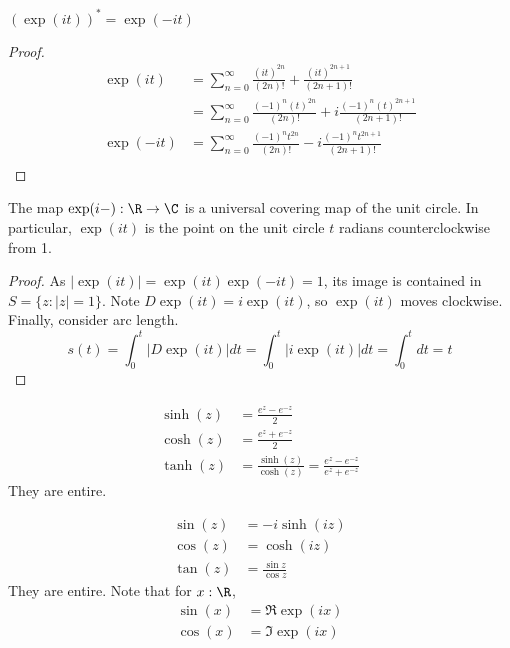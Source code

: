 \documentclass[10pt]{scrartcl}
\numberwithin{thms}{section}
\begin{document}
\begin{lemma}
$\left(\exp(it)\right)^*=\exp(-it)$ 
\end{lemma}
\begin{proof}
  \begin{align*}
    \exp(it)&=\sum_{n=0}^\infty\frac{(it)^{2n}}{(2n)!} +\frac{(it)^{2n+1}}{(2n+1)!}\\
            &=\sum_{n=0}^\infty\frac{(-1)^n(t)^{2n}}{(2n)!} +i\frac{(-1)^n(t)^{2n+1}}{(2n+1)!}\\
    \exp(-it) &=\sum_{n=0}^\infty\frac{(-1)^nt^{2n}}{(2n)!} -i\frac{(-1)^nt^{2n+1}}{(2n+1)!}\\
\end{align*}
\end{proof}

\begin{theorem}
  The map $\exp(i-):\R\to\C$ is a universal covering map of the unit circle. In particular, $\exp(it)$ is the point on the unit circle $t$ radians counterclockwise from 1. 
\end{theorem}
\begin{proof}
  As $|\exp(it)|=\exp(it)\exp(-it)=1$, its image is contained in $S=\{z:|z|=1\}$.
  Note $D\exp(it)=i\exp(it)$, so $\exp(it)$ moves clockwise. 
  Finally, consider arc length.
  \[
  s(t)= \int_0^t |D\exp(it)|dt = \int_0^t |i\exp(it)|dt = \int_0^t dt = t
  \]
\end{proof}

\begin{example}
  \begin{align*}
    \sinh(z)&=\frac{e^z-e^{-z}}2\\
    \cosh(z)&=\frac{e^z+e^{-z}}2\\
    \tanh(z)&=\frac{\sinh(z)}{\cosh(z)}=\frac{e^z-e^{-z}}{e^z+e^{-z}}
  \end{align*}
  They are entire.
\end{example}

\begin{example}[trig]
  \begin{align*}
    \sin(z)&=-i\sinh(iz)\\
    \cos(z)&=\cosh(iz)\\
    \tan(z)&=\frac{\sin z}{\cos z}
  \end{align*}
  They are entire. 
  Note that for $x:\R$, 
  \begin{align*}
    \sin(x)&=\Re \exp(ix)\\
    \cos(x)&=\Im \exp(ix)
  \end{align*}
\end{example}
\end{document}
